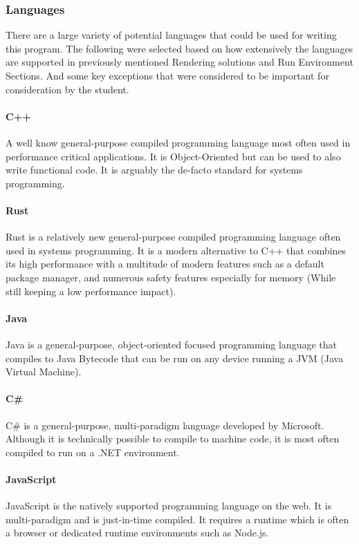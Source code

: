 \subsubsection{Languages}
There are a large variety of potential languages that could be used for writing this program. The following were selected based on how extensively the languages are supported in previously mentioned Rendering solutions and Run Environment Sections. And some key exceptions that were considered to be important for consideration by the student.

\paragraph{C++}
A well know general-purpose compiled programming language most often used in performance critical applications. It is Object-Oriented but can be used to also write functional code. It is arguably the de-facto standard for systems programming. \cite[]{10.1145/323648.323736}

\paragraph{Rust}
Rust is a relatively new general-purpose compiled programming language often used in systems programming. It is a modern alternative to C++ that combines its high performance with a multitude of modern features such as a default package manager, and numerous safety features especially for memory (While still keeping a low performance impact). \cite[]{klabnik_2023_the}

\paragraph{Java}
Java is a general-purpose, object-oriented focused programming language that compiles to Java Bytecode that can be run on any device running a JVM (Java Virtual Machine). \cite[]{amazon_what} \cite[]{oracle_what}

\paragraph{C\#}
C\# is a general-purpose, multi-paradigm language developed by Microsoft. Although it is technically possible to compile to machine code, it is most often compiled to run on a .NET environment. \cite[]{B}

\paragraph{JavaScript}
JavaScript is the natively supported programming language on the web. It is multi-paradigm and is just-in-time compiled. It requires a runtime which is often a browser or dedicated runtime environments such as Node.js. \cite[]{mdncontributors_javascript}

